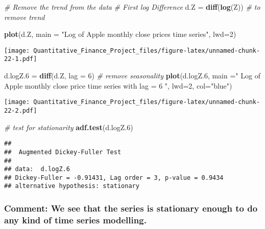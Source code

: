 \documentclass[
]{article}
\newenvironment{Shaded}{\begin{snugshade}}{\end{snugshade}}
\newcommand{\AttributeTok}[1]{\textcolor[rgb]{0.13,0.29,0.53}{#1}}
\newcommand{\CommentTok}[1]{\textcolor[rgb]{0.56,0.35,0.01}{\textit{#1}}}
\newcommand{\DecValTok}[1]{\textcolor[rgb]{0.00,0.00,0.81}{#1}}
\newcommand{\FloatTok}[1]{\textcolor[rgb]{0.00,0.00,0.81}{#1}}
\newcommand{\FunctionTok}[1]{\textcolor[rgb]{0.13,0.29,0.53}{\textbf{#1}}}
\newcommand{\NormalTok}[1]{#1}
\newcommand{\OtherTok}[1]{\textcolor[rgb]{0.56,0.35,0.01}{#1}}
\newcommand{\StringTok}[1]{\textcolor[rgb]{0.31,0.60,0.02}{#1}}
\begin{document}
\begin{Shaded}
\begin{Highlighting}[]
\CommentTok{\# Remove the trend from the data}
\CommentTok{\# First log Difference}
\NormalTok{d.Z }\OtherTok{=} \FunctionTok{diff}\NormalTok{(}\FunctionTok{log}\NormalTok{(Z)) }\CommentTok{\# to remove trend}

\FunctionTok{plot}\NormalTok{(d.Z, }\AttributeTok{main =} \StringTok{"Log of Apple monthly close prices time series"}\NormalTok{, }\AttributeTok{lwd=}\DecValTok{2}\NormalTok{)}
\end{Highlighting}
\end{Shaded}

\texttt{[image: Quantitative\_Finance\_Project\_files/figure-latex/unnamed-chunk-22-1.pdf]}

\begin{Shaded}
\begin{Highlighting}[]
\NormalTok{d.logZ}\FloatTok{.6} \OtherTok{=} \FunctionTok{diff}\NormalTok{(d.Z, }\AttributeTok{lag =} \DecValTok{6}\NormalTok{)  }\CommentTok{\# remove seasonality}
\FunctionTok{plot}\NormalTok{(d.logZ}\FloatTok{.6}\NormalTok{, }\AttributeTok{main =}\StringTok{" Log of Apple monthly close price time series with lag = 6 "}\NormalTok{, }\AttributeTok{lwd=}\DecValTok{2}\NormalTok{, }\AttributeTok{col=}\StringTok{"blue"}\NormalTok{)}
\end{Highlighting}
\end{Shaded}

\texttt{[image: Quantitative\_Finance\_Project\_files/figure-latex/unnamed-chunk-22-2.pdf]}

\begin{Shaded}
\begin{Highlighting}[]
\CommentTok{\# test for stationarity}
\FunctionTok{adf.test}\NormalTok{(d.logZ}\FloatTok{.6}\NormalTok{)}
\end{Highlighting}
\end{Shaded}

\begin{verbatim}
## 
##  Augmented Dickey-Fuller Test
## 
## data:  d.logZ.6
## Dickey-Fuller = -0.91431, Lag order = 3, p-value = 0.9434
## alternative hypothesis: stationary
\end{verbatim}

\hypertarget{comment-we-see-that-the-series-is-stationary-enough-to-do-any-kind-of-time-series-modelling.-2}{%
\subsubsection{Comment: We see that the series is stationary enough to
do any kind of time series
modelling.}\label{comment-we-see-that-the-series-is-stationary-enough-to-do-any-kind-of-time-series-modelling.-2}}
\end{document}
